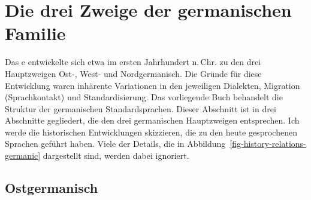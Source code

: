 




\section{Die drei Zweige der germanischen Familie}

Das e entwickelte sich etwa im ersten Jahrhundert n.\,Chr. zu den drei Hauptzweigen Ost-, West- und Nordgermanisch. Die Gründe für diese Entwicklung waren inhärente Variationen in den jeweiligen
Dialekten, Migration (Sprachkontakt) und Standardisierung. Das vorliegende Buch behandelt die Struktur der
germanischen Standardsprachen. Dieser Abschnitt ist in drei Abschnitte gegliedert, die den
drei germanischen Hauptzweigen entsprechen. Ich werde die historischen Entwicklungen skizzieren, die zu den
heute gesprochenen Sprachen geführt haben. Viele der Details, die in Abbildung~\ref{fig-history-relations-germanic} dargestellt sind, werden dabei ignoriert.



\subsection{Ostgermanisch}

